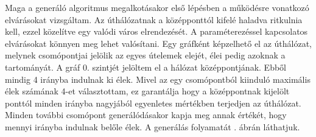 

Maga a generáló algoritmus megalkotásakor első lépésben a működésre vonatkozó elvárásokat vizsgáltam. Az úthálózatnak a középponttól kifelé haladva ritkulnia kell, ezzel közelítve egy 
valódi város elrendezését. A paraméterezéssel kapcsolatos elvárásokat könnyen meg lehet valósítani. Egy gráfként képzelhető el az úthálózat, melynek csomópontjai jelölik az egyes útelemek 
elejét, élei pedig azoknak a tartományát. A gráf 0. szintjét jelöltem el a hálózat középpontjának. Ebből mindig 4 irányba indulnak ki élek. Mivel az egy csomópontból kiinduló maximális élek számának 4-et választottam,
 ez garantálja hogy a középpontnak kijelölt ponttól minden irányba nagyjából egyenletes mértékben terjedjen az úthálózat. Minden további csomópont generálódásakor kapja meg 
annak értékét, hogy mennyi irányba indulnak belőle élek. A generálás folyamatát . ábrán láthatjuk.

